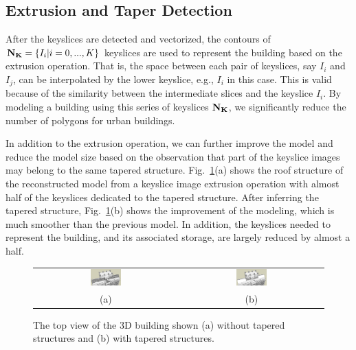 \documentclass[10pt,journal,cspaper,compsoc]{IEEEtran}
\newcommand{\Figa}[1]{Fig.~\ref{fig:#1}(a)}
\newcommand{\Figb}[1]{Fig.~\ref{fig:#1}(b)}
\begin{document}
\subsection{Extrusion and Taper Detection}
\label{sec:tsd}

After the keyslices are detected and vectorized, the contours of
${\bf N_K} = \{I_i | i = 0, ..., K \}$ keyslices are used to represent
the building based on the extrusion operation.
That is, the space between each pair of keyslices, say $I_{i}$ and $I_{j}$,
can be interpolated by the lower keyslice, e.g., $I_{i}$ in this case.
This is valid because of the similarity between the intermediate slices
and the keyslice $I_{i}$.
By modeling a building using this series of keyslices ${\bf N_K}$, 
we significantly reduce the number of polygons for urban buildings. 

In addition to the extrusion operation, we can further improve
the model and reduce the model size based on the observation
that part of the keyslice images may belong to the same tapered structure.
\Figa{DXF_top} shows the roof structure of the reconstructed model 
from a keyslice image extrusion operation with
almost half of the keyslices dedicated to the tapered structure.
After inferring the tapered structure, 
\Figb{DXF_top} shows the improvement of the modeling, 
which is much smoother than the previous model.
In addition, the keyslices needed to represent the building, 
and its associated storage, are largely reduced by almost a half.

\begin{figure}[htbp]
\begin{center}
\begin{tabular}{cc}
\includegraphics[width=0.22\textwidth]{extrude_1.png} &
\includegraphics[width=0.22\textwidth]{extrude_2.png} \\
(a) & (b)
\end{tabular}
\end{center}
\caption{The top view of the 3D building shown 
(a) without tapered structures
and (b) with tapered structures.}
\label{fig:DXF_top}
\end{figure}
\end{document}
